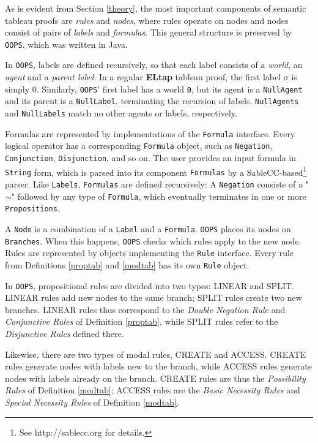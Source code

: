 \documentclass[11pt,a4paper]{article}
\begin{document}
As is evident from Section \ref{theory}, the most important components of semantic tableau proofs are {\it rules} and {\it nodes}, where rules operate on nodes and nodes consist of pairs of {\it labels} and {\it formulas}. This general structure is preserved by  {\tt OOPS}, which was written in Java.
\newline

In {\tt OOPS}, labels are defined recursively, so that each label consists of a {\it world}, an {\it agent} and a {\it parent label}. In a regular {\bf ELtap} tableau proof, the first label $\sigma$ is simply 0. Similarly, {\tt OOPS}' first label has a world {\tt 0}, but its agent is a {\tt NullAgent} and its parent is a {\tt NullLabel}, terminating the recursion of labels. {\tt NullAgents} and {\tt NullLabels} match no other agents or labels, respectively.

Formulas are represented by implementations of the {\tt Formula} interface. Every logical operator has a corresponding {\tt Formula} object, such as {\tt Negation}, {\tt Conjunction}, {\tt Disjunction}, and so on. The user provides an input formula in {\tt String} form, which is parsed into its component {\tt Formulas} by a SableCC-based\footnote{See http://sablecc.org for details.} parser. Like {\tt Labels}, {\tt Formulas} are defined recursively: A {\tt Negation} consists of a "$\sim$" followed by any type of {\tt Formula}, which eventually terminates in one or more {\tt Propositions}.

\newpage

A {\tt Node} is a combination of a {\tt Label} and a {\tt Formula}. {\tt OOPS} places its nodes on {\tt Branches}. When this happens, {\tt OOPS} checks which rules apply to the new node. Rules are represented by objects implementing the {\tt Rule} interface. Every rule from Definitions \ref{proptab} and \ref{modtab} has its own {\tt Rule} object.

In {\tt OOPS}, propositional rules are divided into two types: LINEAR and SPLIT. LINEAR rules add new nodes to the same branch; SPLIT rules create two new branches. LINEAR rules thus correspond to the {\it Double Negation Rule} and {\it Conjunctive Rules} of Definition \ref{proptab}, while SPLIT rules refer to the {\it Disjunctive Rules} defined there.

Likewise, there are two types of modal rules, CREATE and ACCESS. CREATE rules generate nodes with labels new to the branch, while ACCESS rules generate nodes with labels already on the branch. CREATE rules are thus the {\it Possibility Rules} of Definition \ref{modtab}; ACCESS rules are the {\it Basic Necessity Rules} and {\it Special Necessity Rules} of Definition \ref{modtab}.
\newline
\end{document}
